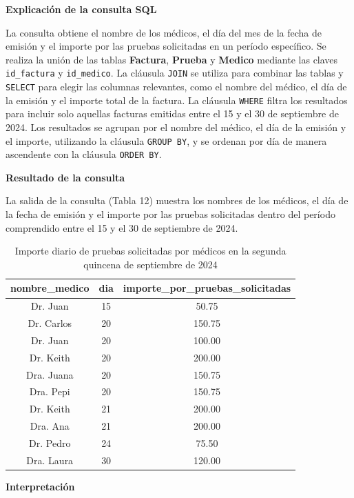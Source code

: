 \documentclass[spanish]{article}
\begin{document}
\textbf{Explicación de la consulta SQL}

La consulta obtiene el nombre de los médicos, el día del mes de la fecha de emisión y el importe por las pruebas solicitadas en un período específico. Se realiza la unión de las tablas \textbf{Factura}, \textbf{Prueba} y \textbf{Medico} mediante las claves \texttt{id\_factura} y \texttt{id\_medico}. La cláusula \texttt{JOIN} se utiliza para combinar las tablas y \texttt{SELECT} para elegir las columnas relevantes, como el nombre del médico, el día de la emisión y el importe total de la factura. La cláusula \texttt{WHERE} filtra los resultados para incluir solo aquellas facturas emitidas entre el 15 y el 30 de septiembre de 2024. Los resultados se agrupan por el nombre del médico, el día de la emisión y el importe, utilizando la cláusula \texttt{GROUP BY}, y se ordenan por día de manera ascendente con la cláusula \texttt{ORDER BY}.

\textbf{Resultado de la consulta}

La salida de la consulta (Tabla 12) muestra los nombres de los médicos, el día de la fecha de emisión y el importe por las pruebas solicitadas dentro del período comprendido entre el 15 y el 30 de septiembre de 2024. 

\begin{table}[h!]
\centering
\begin{tabular}{|c|c|c|}
\hline
\textbf{nombre\_medico} & \textbf{dia} & \textbf{importe\_por\_pruebas\_solicitadas} \\
\hline
Dr. Juan & 15 & 50.75 \\ \hline
Dr. Carlos & 20 & 150.75 \\ \hline
Dr. Juan & 20 & 100.00 \\ \hline
Dr. Keith & 20 & 200.00 \\ \hline
Dra. Juana & 20 & 150.75 \\ \hline
Dra. Pepi & 20 & 150.75 \\ \hline
Dr. Keith & 21 & 200.00 \\ \hline
Dra. Ana & 21 & 200.00 \\ \hline
Dr. Pedro & 24 & 75.50 \\ \hline
Dra. Laura & 30 & 120.00 \\ \hline
\end{tabular}
\caption{Importe diario de pruebas solicitadas por médicos en la segunda quincena de septiembre de 2024}
\label{tab:historial_prueba}
\end{table}

\textbf{Interpretación}
\end{document}
